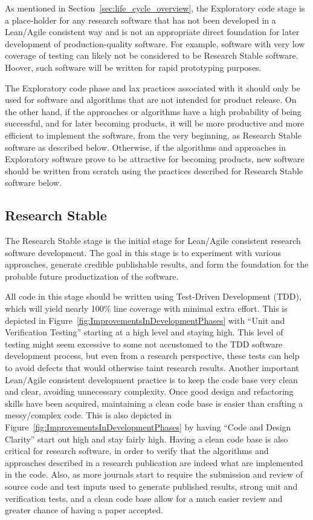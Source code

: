 \documentclass[11pt]{SANDreport}
\begin{document}
As mentioned in Section~\ref{sec:life_cycle_overview}, the Exploratory
code stage is a place-holder for any research software that has not
been developed in a Lean/Agile consistent way and is not an
appropriate direct foundation for later development of
production-quality software.  For example, software with very low
coverage of testing can likely not be considered to be Research Stable
software.  Hoover, such software will be written for rapid prototyping
purposes.

The Exploratory code phase and lax practices associated with it should
only be used for software and algorithms that are not intended for product
release.  On the other hand, if the approaches or algorithms have a
high probability of being successful, and for later becoming products, it 
will be more productive and more efficient
to implement the software, from the very beginning, as Research Stable
software as described below.  Otherwise, if the algorithms and
approaches in Exploratory software prove to be attractive for
becoming products, new software should be written from scratch using
the practices described for Research Stable software below.


%
{}\subsection{Research Stable}
\label{sec:research_stable_code}
%

The Research Stable stage is the initial stage for Lean/Agile
consistent research software development.  The goal in this stage is
to experiment with various approaches, generate credible publishable
results, and form the foundation for the probable future
productization of the software.

All code in this stage should be written using Test-Driven Development
(TDD), which will yield nearly 100\% line coverage with minimal extra
effort.  This is depicted in
Figure~\ref{fig:ImprovementsInDevelopmentPhases} with ``Unit and
Verification Testing'' starting at a high level and staying high.
This level of testing might seem excessive to some not accustomed to
the TDD software development process, but even from a research
perspective, these tests can help to avoid defects that would
otherwise taint research results.  Another important Lean/Agile
consistent development practice is to keep the code base very clean
and clear, avoiding unnecessary complexity.  Once good design and
refactoring skills have been acquired, maintaining a clean code base is
easier than crafting a messy/complex code.  This is also depicted in
Figure~\ref{fig:ImprovementsInDevelopmentPhases} by having ``Code and
Design Clarity'' start out high and stay fairly high.  Having a clean
code base is also critical for research software, in order to
verify that the algorithms and approaches described in a research
publication are indeed what are implemented in the code.  Also, as
more journals start to require the submission and review of source code
and test inputs used to generate published results, strong unit and
verification tests, and a clean code base allow for a much easier
review and greater chance of having a paper accepted.  
\end{document}

